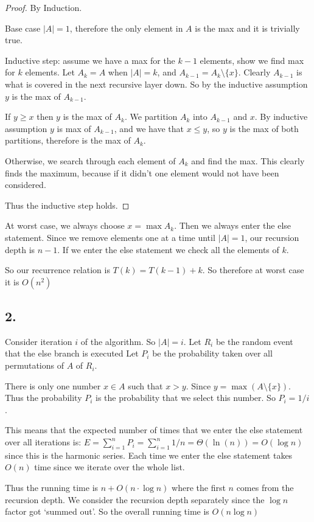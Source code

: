 \documentclass[11pt]{article}
\begin{document}
\begin{proof}
    By Induction.

    Base case $|A| = 1$, therefore the only element in $A$ is the max and it is trivially true.

    Inductive step: assume we have a max for the $k-1$ elements, show we find max for $k$ elements.
    Let $A_k = A$ when $|A| = k$, and $A_{k-1} = A_k \setminus \{x\}$.
    Clearly $A_{k-1}$ is what is covered in the next recursive layer down. 
    So by the inductive assumption $y$ is the max of $A_{k-1}$.

    If $y \geq x$ then $y$ is the max of $A_k$. We partition $A_k$ into $A_{k-1}$ and ${x}$.
    By inductive assumption $y$ is max of $A_{k-1}$, and we have that $x \leq y$, so $y$
    is the max of both partitions, therefore is the max of $A_k$.

    Otherwise, we search through each element of $A_k$ and find the max. This clearly
    finds the maximum, because if it didn't one element would not have been considered. 

    Thus the inductive step holds.
\end{proof}

At worst case, we always choose $x = \max A_k$. Then we always enter the else statement.
Since we remove elements one at a time until $|A| = 1$, our recursion depth is $n-1$.
If we enter the else statement we check all the elements of $k$.

So our recurrence relation is $T(k) = T(k-1) + k$. So therefore at worst case it is $O(n^2)$


\subsection*{2. }

Consider iteration $i$ of the algorithm. So $|A| = i$.
Let $R_i$ be the random event that the else branch is executed
Let $P_i$ be the probability taken over all permutations of $A$ of $R_i$.

There is only one number $x \in A$ such that $x > y$. Since $y = \max (A \setminus \{x\})$.
Thus the probability $P_i$ is the probability that we select this number. So $P_i = 1/i$.

This means that the expected number of times that we enter the else statement over all iterations is:
$E = \sum_{i = 1} ^n P_i = \sum_{i = 1} ^n 1/n = \Theta(\ln (n)) = O(\log n)$ since this is the harmonic series.
Each time we enter the else statement takes $O(n)$ time since we iterate over the whole list.

Thus the running time is $n + O(n \cdot \log n)$ where the first $n$ comes from the recursion depth.
We consider the recursion depth separately since the $\log n$ factor got `summed out'.
So the overall running time is $O(n \log n)$
\end{document}
